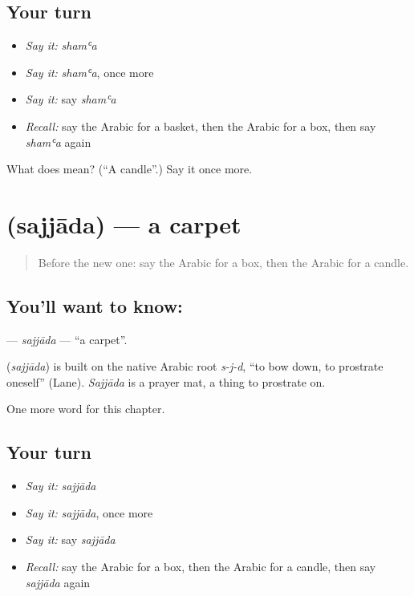 \subsection*{Your turn}
\begin{itemize}
\raggedright
  \item \emph{Say it:} \emph{shamʿa}
  \item \emph{Say it:} \emph{shamʿa}, once more
  \item \emph{Say it:} say \emph{shamʿa}
  \item \emph{Recall:} say the Arabic for a basket, then the Arabic for a box, then say \emph{shamʿa} again
\end{itemize}

\begin{tcolorbox}[breakable,colback=teal!4,colframe=teal!35!black,title={Before you move on}]
What does  mean? (\textquotedblleft{}A candle\textquotedblright{}.) Say it once more.
\end{tcolorbox}
\section[\texorpdfstring{\ar{سجادة} (sajjāda)}{سجادة (sajjāda)}]{ (sajjāda) — a carpet}

\label{lesson:AR-C126-sajjada}



\begin{quote}
Before the new one: say the Arabic for a box, then the Arabic for a candle.
\end{quote}

\subsection*{You'll want to know: }
\textbf{} — \emph{sajjāda} — \textquotedblleft{}a carpet\textquotedblright{}.

\begin{cousinweb}
\textbf{} (\emph{sajjāda}) is built on the native Arabic root \emph{s-j-d}, \textquotedblleft{}to bow down, to prostrate oneself\textquotedblright{} (Lane). \emph{Sajjāda} is a prayer mat, a thing to prostrate on.
\end{cousinweb}

\begin{grammarlens}[title={What you've built}]
One more word for this chapter.
\end{grammarlens}

\subsection*{Your turn}
\begin{itemize}
\raggedright
  \item \emph{Say it:} \emph{sajjāda}
  \item \emph{Say it:} \emph{sajjāda}, once more
  \item \emph{Say it:} say \emph{sajjāda}
  \item \emph{Recall:} say the Arabic for a box, then the Arabic for a candle, then say \emph{sajjāda} again
\end{itemize}

